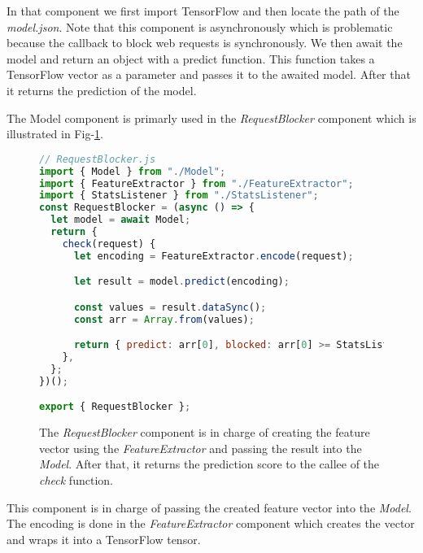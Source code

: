 In that component we first import TensorFlow and then locate the path of the \emph{model.json}. Note that this component is asynchronously
which is problematic because the callback to block web requests is synchronously. We then await the model and return an object with a predict function.
This function takes a TensorFlow vector as a parameter and passes it to the awaited model. After that it returns the prediction of the model.

The Model component is primarly used in the \emph{RequestBlocker} component which is illustrated in Fig-\ref{fig:blocker}.
\begin{figure}[ht!]
  \begin{lstlisting}[language=JavaScript]
// RequestBlocker.js
import { Model } from "./Model";
import { FeatureExtractor } from "./FeatureExtractor";
import { StatsListener } from "./StatsListener";
const RequestBlocker = (async () => {
  let model = await Model;
  return {
    check(request) {
      let encoding = FeatureExtractor.encode(request);

      let result = model.predict(encoding);

      const values = result.dataSync();
      const arr = Array.from(values);

      return { predict: arr[0], blocked: arr[0] >= StatsListener.getRate() };
    },
  };
})();

export { RequestBlocker };
\end{lstlisting}
\caption{The \emph{RequestBlocker} component is in charge of creating the feature vector using the \emph{FeatureExtractor} and passing the 
result into the \emph{Model}. After that, it returns the prediction score to the callee of the \emph{check} function.}
\label{fig:blocker}
\end{figure}
This component is in charge of passing the created feature vector into the \emph{Model}. The encoding is done in the \emph{FeatureExtractor}
component which creates the vector and wraps it into a TensorFlow tensor.



